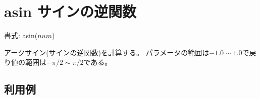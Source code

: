 
%

\section{asin サインの逆関数\label{sect:asin}}

書式: asin($num$)

アークサイン(サインの逆関数)を計算する。
パラメータの範囲は$-1.0\sim 1.0$で戻り値の範囲は$-\pi/2\sim \pi/2$である。

\subsection*{利用例}


%

